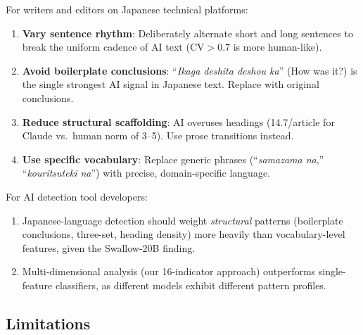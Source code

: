 \documentclass[11pt,a4paper]{article}
\begin{document}
For writers and editors on Japanese technical platforms:

\begin{enumerate}
    \item \textbf{Vary sentence rhythm}: Deliberately alternate short and long sentences to break the uniform cadence of AI text ($\text{CV} > 0.7$ is more human-like).
    \item \textbf{Avoid boilerplate conclusions}: ``\textit{Ikaga deshita deshou ka}'' (How was it?) is the single strongest AI signal in Japanese text. Replace with original conclusions.
    \item \textbf{Reduce structural scaffolding}: AI overuses headings (14.7/article for Claude vs.\ human norm of 3--5). Use prose transitions instead.
    \item \textbf{Use specific vocabulary}: Replace generic phrases (``\textit{samazama na},'' ``\textit{kouritsuteki na}'') with precise, domain-specific language.
\end{enumerate}

For AI detection tool developers:

\begin{enumerate}
    \item Japanese-language detection should weight \textit{structural} patterns (boilerplate conclusions, three-set, heading density) more heavily than vocabulary-level features, given the Swallow-20B finding.
    \item Multi-dimensional analysis (our 16-indicator approach) outperforms single-feature classifiers, as different models exhibit different pattern profiles.
\end{enumerate}

\subsection{Limitations}
\end{document}
